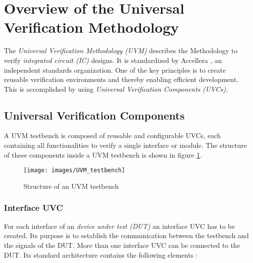 \section{Overview of the Universal Verification Methodology}\label{uvm}

The \emph{Universal Verification Methodology (UVM)} describes the Methodology to
verify \emph{integrated circuit (IC)} designs. It is standardized by Accellera \cite{uvm},
an independent standards organization. One of the key principles is to create
reusable verification environments and thereby enabling efficient development.
This is accomplished by using \emph{Universal Verification Components (UVCs)}.

\subsection{Universal Verification Components}\label{uvc}

A UVM testbench is composed of reusable and configurable UVCs, each
containing all functionalities to verify a single interface or module. The
structure of these components inside a UVM testbench is shown in figure
\ref{fig:UVM_testbench}.

\begin{figure}[htb]
 \centering
 \texttt{[image: images/UVM\_testbench]}
 \caption{Structure of an UVM testbench}
\label{fig:UVM_testbench}
\end{figure}

\subsubsection{Interface UVC}\label{interface_uvc}

For each interface of an \emph{device under test (DUT)} an interface UVC has
to be created. Its purpose is to establish the communication between
the testbench and the signals of the DUT. More than one interface UVC can be
connected to the DUT. Its standard architecture contains the following elements \cite{uvm_sv}:


